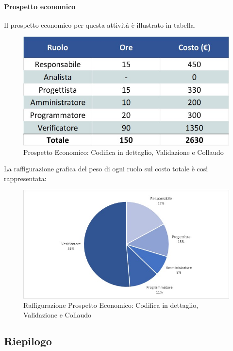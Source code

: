 \paragraph{Prospetto economico}
Il prospetto economico per questa attività è illustrato in tabella. 
\begin{figure}[h!]
	\centerline{\includegraphics[scale=0.4]{img/Preventivo/CodDettaglioValidazioneCollaudo.Economico.jpg}}
	\caption{Prospetto Economico: Codifica in dettaglio, Validazione e Collaudo}
\end{figure}
La raffigurazione grafica del peso di ogni ruolo sul costo totale è così rappresentata: 
\begin{figure}[h!]
	\centerline{\includegraphics[scale=0.4]{img/Preventivo/Torte/CodDettaglioValidazioneCollaudo.jpg}}
	\caption{Raffigurazione Prospetto Economico: Codifica in dettaglio, Validazione e Collaudo}
\end{figure} 

\subsection{Riepilogo}

